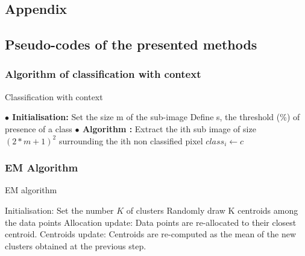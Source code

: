 \documentclass{siamart171218}
\begin{document}
\newpage
\begin{appendices}

\chapter{Appendix}

\label{a_micro}


\section{Pseudo-codes of the presented methods}

\subsection{Algorithm of classification with context}
\label{Annexe:classif_context}

\begin{algorithm}[h!]
	\caption{Classification with context} 
	\begin{algorithmic}[1]
	    \State \textbf{$\bullet$ Initialisation:}
	    \State Set the size m of the sub-image
	    \State Define s, the threshold (\%) of presence of a class
	    \State \textbf{$\bullet$ Algorithm :}
			\State Extract the ith sub image of size $(2*m+1)^2$ surrounding the ith non classified pixel 
			    \State $class_i \gets c$
			 \EndIf
		\EndFor
	\end{algorithmic} 
	\label{Algo:Context}
\end{algorithm}

\subsection{EM Algorithm}
\label{Annexe:EM_algo}

\begin{algorithm}[h!]
	\caption{EM algorithm} 
	\begin{algorithmic}[1]
	    \State Initialisation:
	    \State Set the number $K$ of clusters 
	    \State Randomly draw K centroids among the data points 
			\State Allocation update: Data points are re-allocated to their closest centroid.
			\State Centroids update: Centroids are re-computed as the mean of the new clusters obtained at the previous step.
		\EndWhile
	\end{algorithmic} 
	\label{algo:EM}
\end{algorithm}



\end{appendices}
\end{document}

